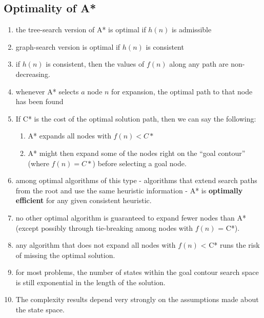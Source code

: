 \subsection{Optimality of A* \cite{aci-1}}

\begin{enumerate}
    \item the tree-search version of A* is optimal if $h(n)$ is admissible

    \item graph-search version is optimal if $h(n)$ is consistent

    \item if $h(n)$ is consistent, then the values of $f(n)$ along any path are non-decreasing.

    \item whenever A* selects $a$ node $n$ for expansion, the optimal path to that node has been found

    \item If C* is the cost of the optimal solution path, then we can say the following:
    \begin{enumerate}
        \item A* expands all nodes with $f(n) < C*$

        \item A* might then expand some of the nodes right on the “goal contour” (where $f(n) = C*$) before selecting a goal node.
    \end{enumerate}

    \item among optimal algorithms of this type - algorithms that extend search paths from the root and use the same heuristic information - A* is \textbf{optimally efficient} for any given consistent heuristic.

    \item no other optimal algorithm is guaranteed to expand fewer nodes than A* (except possibly through tie-breaking among nodes with $f(n)$ = C*). 
    
    \item any algorithm that does not expand all nodes with $f(n)$ < C* runs the risk of missing the optimal solution.

    \item  for most problems, the number of states within the goal contour search space is still exponential in the length of the solution.

    \item The complexity results depend very strongly on the assumptions made about the state space. 
    

\end{enumerate}
